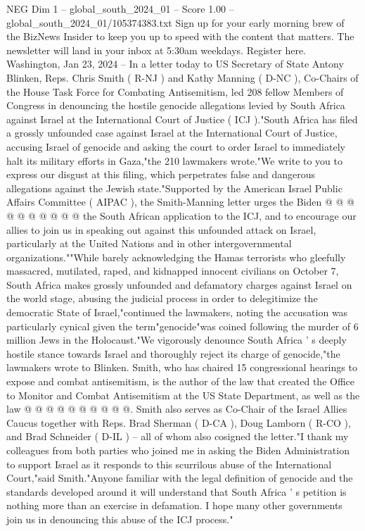 \begin{textsample}{NEG Dim 1 – global\_south\_2024\_01 – Score 1.00 – global\_south\_2024\_01/105374383.txt}  \label{ex:f1_neg_338}
Sign up for your early morning brew of the BizNews Insider to keep you up to speed with the content that matters.
The newsletter will land in your inbox at 5:30am weekdays.
Register here.
Washington, Jan 23, 2024 -- In a letter today to US Secretary of State Antony Blinken, Reps.
Chris Smith ( R-NJ ) and Kathy Manning ( D-NC ), Co-Chairs of the House Task Force for Combating Antisemitism, led 208 fellow Members of Congress in denouncing the hostile genocide allegations levied by South Africa against Israel at the International Court of Justice ( ICJ )."South Africa has filed a grossly unfounded case against Israel at the International Court of Justice, accusing Israel of genocide and asking the court to order Israel to immediately halt its military efforts in Gaza,"the 210 lawmakers wrote."We write to you to express our disgust at this filing, which perpetrates false and dangerous allegations against the Jewish state."Supported by the American Israel Public Affairs Committee ( AIPAC ), the Smith-Manning letter urges the Biden @ @ @ @ @ @ @ @ @ @ the South African application to the ICJ, and to encourage our allies to join us in speaking out against this unfounded attack on Israel, particularly at the United Nations and in other intergovernmental organizations.""While barely acknowledging the Hamas terrorists who gleefully massacred, mutilated, raped, and kidnapped innocent civilians on October 7, South Africa makes grossly unfounded and defamatory charges against Israel on the world stage, abusing the judicial process in order to delegitimize the democratic State of Israel,"continued the lawmakers, noting the accusation was particularly cynical given the term"genocide"was coined following the murder of 6 million Jews in the Holocaust."We vigorously denounce South Africa ' s deeply hostile stance towards Israel and thoroughly reject its charge of genocide,"the lawmakers wrote to Blinken.
Smith, who has chaired 15 congressional hearings to expose and combat antisemitism, is the author of the law that created the Office to Monitor and Combat Antisemitism at the US State Department, as well as the law @ @ @ @ @ @ @ @ @ @.
Smith also serves as Co-Chair of the Israel Allies Caucus together with Reps.
Brad Sherman ( D-CA ), Doug Lamborn ( R-CO ), and Brad Schneider ( D-IL ) -- all of whom also cosigned the letter."I thank my colleagues from both parties who joined me in asking the Biden Administration to support Israel as it responds to this scurrilous abuse of the International Court,"said Smith."Anyone familiar with the legal definition of genocide and the standards developed around it will understand that South Africa ' s petition is nothing more than an exercise in defamation.
I hope many other governments join us in denouncing this abuse of the ICJ process."

\end{textsample}
